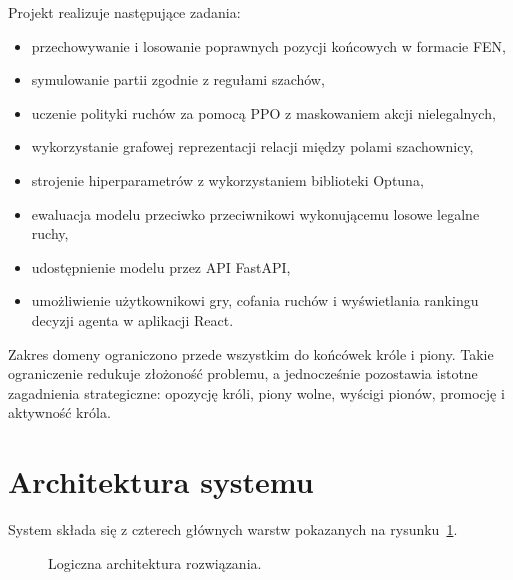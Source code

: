\documentclass[12pt,a4paper]{article}
\begin{document}
Projekt realizuje następujące zadania:

\begin{itemize}[leftmargin=*]
    \item przechowywanie i losowanie poprawnych pozycji końcowych w formacie FEN,
    \item symulowanie partii zgodnie z regułami szachów,
    \item uczenie polityki ruchów za pomocą PPO z maskowaniem akcji nielegalnych,
    \item wykorzystanie grafowej reprezentacji relacji między polami szachownicy,
    \item strojenie hiperparametrów z wykorzystaniem biblioteki Optuna,
    \item ewaluacja modelu przeciwko przeciwnikowi wykonującemu losowe legalne ruchy,
    \item udostępnienie modelu przez API FastAPI,
    \item umożliwienie użytkownikowi gry, cofania ruchów i wyświetlania rankingu
    decyzji agenta w aplikacji React.
\end{itemize}

Zakres domeny ograniczono przede wszystkim do końcówek króle i piony. Takie
ograniczenie redukuje złożoność problemu, a jednocześnie pozostawia istotne
zagadnienia strategiczne: opozycję króli, piony wolne, wyścigi pionów, promocję
i aktywność króla.

\section{Architektura systemu}

System składa się z czterech głównych warstw pokazanych na
rysunku~\ref{fig:architecture}.

\begin{figure}[H]
\centering
{}
\caption{Logiczna architektura rozwiązania.}
\label{fig:architecture}
\end{figure}
\end{document}
